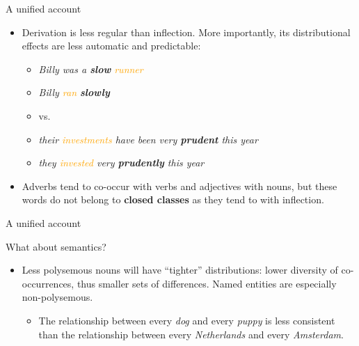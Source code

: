 \documentclass{beamer}
\begin{document}
\begin{frame}{A unified account}

\begin{itemize}
\item Derivation is less regular than inflection. More importantly, its distributional effects are less automatic and predictable:

\begin{itemize}
\item[] \emph{Billy was a \textbf{slow} \textcolor{orange}{runner}}
\item[] \emph{Billy \textcolor{orange}{ran} \textbf{slowly}}
\item[] \hspace{1.5cm}vs.
\item[] \emph{their \textcolor{orange}{investments} have been very \textbf{prudent} this year}
\item[] \emph{they \textcolor{orange}{invested} very \textbf{prudently} this year}
\end{itemize}

\item Adverbs tend to co-occur with verbs and adjectives with nouns, but these words do not belong to \textbf{closed classes} as they tend to with inflection.

\end{itemize}
\end{frame}
\begin{frame}{A unified account}

What about semantics?

\begin{itemize}
\item Less polysemous nouns will have ``tighter'' distributions: lower diversity of co-occurrences, thus smaller sets of differences.
Named entities are especially non-polysemous.
\begin{itemize}
\item
The relationship between every \emph{dog} and every \emph{puppy} is less consistent than the relationship between every \emph{Netherlands} and every \emph{Amsterdam}.
\end{itemize}


\end{itemize}

\end{frame}
\end{document}
